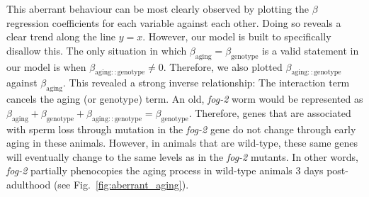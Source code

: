 \documentclass[9pt,twocolumn,twoside]{gsag3jnl}
\newcommand{\fog}{\emph{fog-2}}
\begin{document}
This aberrant behaviour can be most clearly observed by plotting the $\beta$ regression coefficients for each variable against each other. Doing so reveals a clear trend along the line $y=x$. However, our model is built to specifically disallow this. The only situation in which $\beta_\mathrm{aging} = \beta_\mathrm{genotype}$ is a valid statement in our model is when $\beta_\mathrm{aging::genotype} \neq 0$. Therefore, we also plotted $\beta_\mathrm{aging::genotype}$ against $\beta_\mathrm{aging}$. This revealed a strong inverse relationship: The interaction term cancels the aging (or genotype) term. An old, \fog{} worm would be represented as
$\beta_\mathrm{aging} +\beta_\mathrm{genotype} + \beta_\mathrm{aging::genotype} = \beta_\mathrm{genotype}$.
Therefore, genes that are associated with sperm loss through mutation in the \fog{} gene do not change through early aging in these animals. However, in animals that are wild-type, these same genes will eventually change to the same levels as in the \fog{} mutants. In other words, \fog{} partially phenocopies the aging process in wild-type animals 3 days post-adulthood (see Fig.~\ref{fig:aberrant_aging}).
\end{document}

